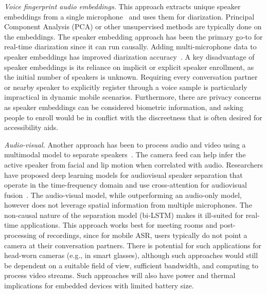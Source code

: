 \textit{Voice fingerprint audio embeddings.}
This approach extracts unique speaker embeddings from a single microphone~\cite{wang2018speaker,snyder2019speaker} and uses them for diarization. Principal Component Analysis (PCA) or other unsupervised methods are typically done on the embeddings. The speaker embedding approach has been the primary go-to for real-time diarization since it can run causally. Adding multi-microphone data to speaker embeddings has improved diarization accuracy~\cite{snyder2019speaker}. A key disadvantage of speaker embeddings is its reliance on implicit or explicit speaker enrollment, as the initial number of speakers is unknown. Requiring every conversation partner or nearby speaker to explicitly register through a voice sample is particularly impractical in dynamic mobile scenarios. Furthermore, there are privacy concerns as speaker embeddings can be considered biometric information, and asking people to enroll would be in conflict with the discreetness that is often desired for accessibility aids. 


\textit{Audio-visual.}
Another approach has been to process audio and video using a multimodal model to separate speakers~\cite{gebru2017audio,ephrat2018looking}. The camera feed can help infer the active speaker from facial and lip motion when correlated with audio. Researchers have proposed deep learning models for audiovisual speaker separation that operate in the time-frequency domain and use cross-attention for audiovisual fusion~\cite{10446297}. The audio-visual model, while outperforming an audio-only model, however does not leverage spatial information from multiple microphones. The non-causal nature of the separation model (bi-LSTM) makes it ill-suited for real-time applications. This approach works best for meeting rooms and post-processing of recordings, since for mobile ASR, users typically do not point a camera at their conversation partners. There is potential for such applications for head-worn cameras (e.g., in smart glasses), although such approaches would still be dependent on a suitable field of view, sufficient bandwidth, and computing to process video streams. Such approaches will also have power and thermal implications for embedded devices with limited battery size.


